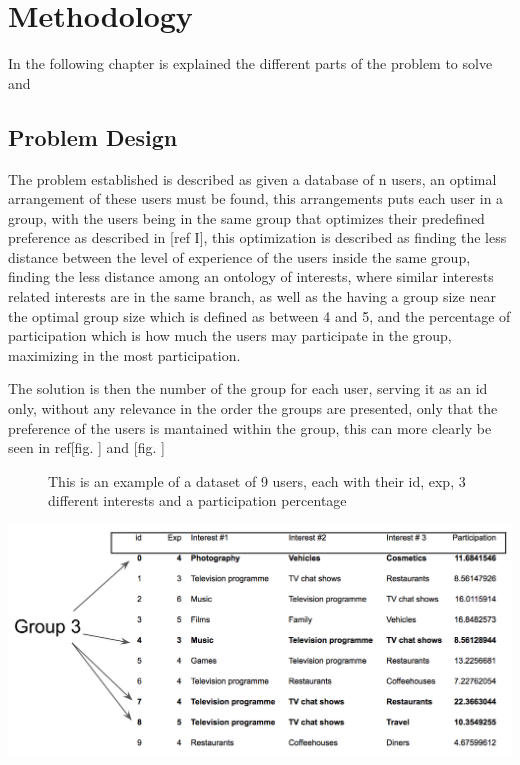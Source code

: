 \chapter{Methodology}
\label{chapter:chapter03}

In the following chapter is explained the different parts of the problem to solve and 




\section{Problem Design}

The problem established is described as given a database of n users, an optimal arrangement of these users must be found, this arrangements puts each user in a group, with the users being in the same group that optimizes their predefined preference as described in [ref I], this optimization is described as finding the less distance between the level of experience of the users inside the same group, finding the less distance among an ontology of interests, where similar interests related interests are in the same branch, as well as the having a group size near the optimal group size which is defined as between 4 and 5, and the percentage of participation which is how much the users may participate in the group, maximizing in the most participation.

The solution is then the number of the group for each user, serving it as an id only, without any relevance in the order the groups are presented, only that the preference of the users is mantained within the group, this can more clearly be seen in ref[fig. ] and [fig. ]

\begin{figure}[dataset]
    \caption{This is an example of a dataset of 9 users, each with their id, exp, 3 different interests and a participation percentage}
    
\end{figure}
\includegraphics[]{images/dataset_eg.png}


